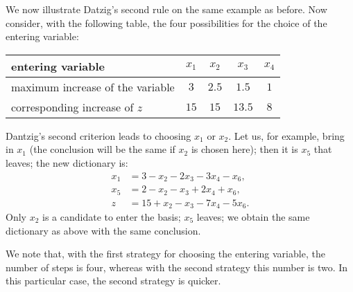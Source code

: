 \begin{example}
    We now illustrate Datzig's second rule on the same example as before. Now consider, with the following table, the four possibilities for the choice of the entering variable:
    \begin{center}
        \begin{tabular}{lcccc}
        \hline
        entering variable & \(x_1\) & \(x_2\) & \(x_3\) & \(x_4\) \\
        \hline
        maximum increase of the variable & \(3\) & \(2.5\) & \(1.5\) & \(1\) \\
        corresponding increase of \(z\) & \(15\) & \(15\) & \(13.5\) & \(8\) \\
        \hline
        \end{tabular}
    \end{center}

    Dantzig's second criterion leads to choosing \(x_1\) or \(x_2\). Let us, for example, bring in \(x_1\) (the conclusion will be the same if \(x_2\) is chosen here); then it is \(x_5\) that leaves; the new dictionary is:
    \[
        \begin{aligned}
        x_1 &= 3 - x_2 - 2x_3 - 3x_4 - x_6,\\
        x_5 &= 2 - x_2 - x_3 + 2x_4 + x_6,\\
        \hline
        z &= 15 + x_2 - x_3 - 7x_4 - 5x_6.
        \end{aligned}
    \]
    Only \(x_2\) is a candidate to enter the basis; \(x_5\) leaves; we obtain the same dictionary as above with the same conclusion.

    We note that, with the first strategy for choosing the entering variable, the number of steps is four, whereas with the second strategy this number is two. In this particular case, the second strategy is quicker.
\end{example}

